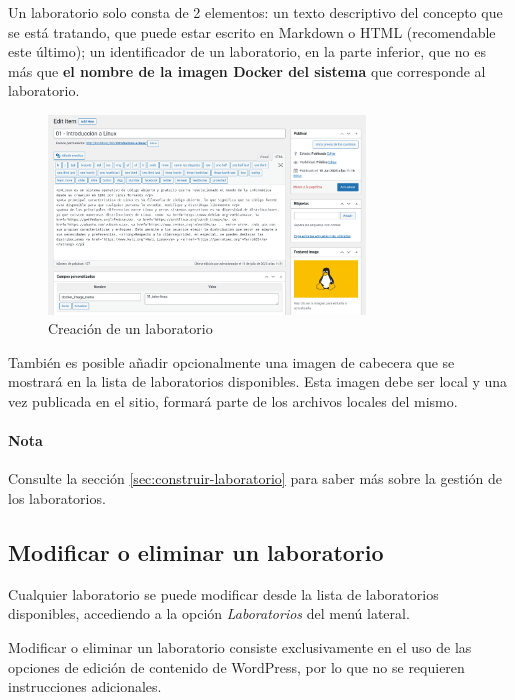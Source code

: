             Un laboratorio solo consta de 2 elementos: un texto descriptivo del concepto que se está tratando, que puede estar escrito en Markdown o HTML (recomendable este último); un identificador de un laboratorio, en la parte inferior, que no es más que \textbf{el nombre de la imagen Docker del sistema} que corresponde al laboratorio.

            \begin{figure}[!htbp]
                \centering

                \includegraphics[width=0.75\textwidth]{images/Capturas/localhost/creacion.png}
                \caption{Creación de un laboratorio}
                \label{fig:anadir-laboratorio}
            \end{figure}

            También es posible añadir opcionalmente una imagen de cabecera que se mostrará en la lista de laboratorios disponibles. Esta imagen debe ser local y una vez publicada en el sitio, formará parte de los archivos locales del mismo.

            \paragraph{Nota}
            
                Consulte la sección \ref{sec:construir-laboratorio} para saber más sobre la gestión de los laboratorios.

        \subsection{Modificar o eliminar un laboratorio}

            Cualquier laboratorio se puede modificar desde la lista de laboratorios disponibles, accediendo a la opción \textit{Laboratorios} del menú lateral.

            Modificar o eliminar un laboratorio consiste exclusivamente en el uso de las opciones de edición de contenido de WordPress, por lo que no se requieren instrucciones adicionales.

